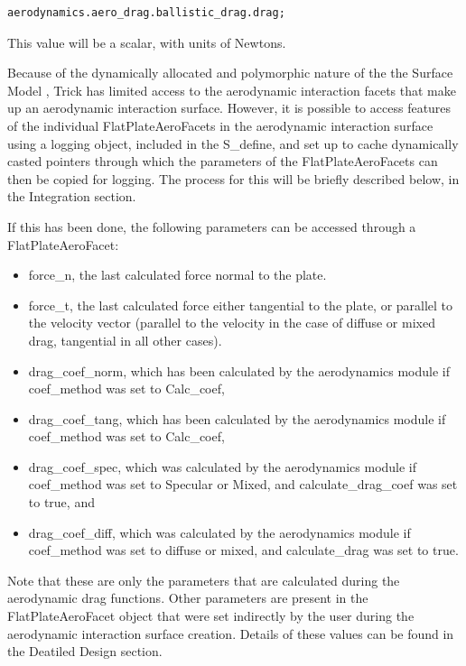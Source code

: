 \begin{verbatim}
aerodynamics.aero_drag.ballistic_drag.drag;
\end{verbatim}

This value will be a scalar, with units of Newtons.

Because of the dynamically allocated and polymorphic
nature of the the Surface
Model \cite{dynenv:SURFACEMODEL}, Trick has limited access to the
aerodynamic interaction facets that make up an aerodynamic interaction
surface. However, it is possible to access features of the individual
FlatPlateAeroFacets in the aerodynamic interaction surface using
a logging object, included in the S\_define, and set up to
cache dynamically casted pointers through which the parameters of
the FlatPlateAeroFacets can then be copied for logging. The process
for this will be briefly described below, in the Integration section.

If this has been done, the following parameters can be
accessed through a FlatPlateAeroFacet:

\begin{itemize}
\item{force\_n}, the last calculated force normal to the plate.
\item{force\_t}, the last calculated force either tangential to
the plate, or parallel to the velocity vector (parallel to the
velocity in the case of diffuse or mixed drag, tangential in all
other cases).
\item{drag\_coef\_norm}, which has been calculated by the
aerodynamics module if coef\_method was set to Calc\_coef,
\item{drag\_coef\_tang}, which has been calculated by the
aerodynamics module if coef\_method was set to Calc\_coef,
\item{drag\_coef\_spec}, which was calculated by the
aerodynamics module if coef\_method was set to Specular
or Mixed, and calculate\_drag\_coef was set to true, and
\item{drag\_coef\_diff}, which was calculated by the
aerodynamics module if coef\_method was set to diffuse
or mixed, and calculate\_drag was set to true.
\end{itemize}

Note that these are only the parameters that are calculated during
the aerodynamic drag functions. Other parameters are present in the
FlatPlateAeroFacet object that were set indirectly by the user
during the aerodynamic interaction surface creation. Details of
these values can be found in the Deatiled Design section.


